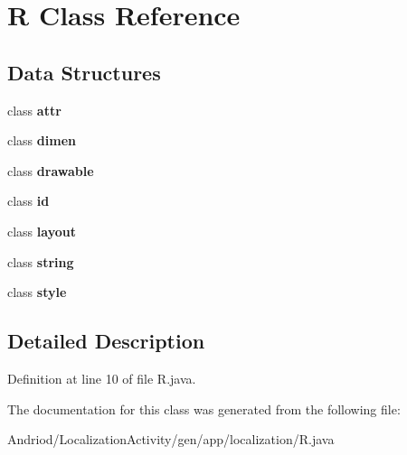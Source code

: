 \hypertarget{classapp_1_1localization_1_1_r}{\section{R Class Reference}
\label{classapp_1_1localization_1_1_r}
}
\subsection*{Data Structures}
\begin{DoxyCompactItemize}
\item 
class {\bfseries attr}
\item 
class {\bfseries dimen}
\item 
class {\bfseries drawable}
\item 
class {\bfseries id}
\item 
class {\bfseries layout}
\item 
class {\bfseries string}
\item 
class {\bfseries style}
\end{DoxyCompactItemize}


\subsection{Detailed Description}


Definition at line 10 of file R.\-java.



The documentation for this class was generated from the following file\-:\begin{DoxyCompactItemize}
\item 
Andriod/\-Localization\-Activity/gen/app/localization/R.\-java\end{DoxyCompactItemize}
